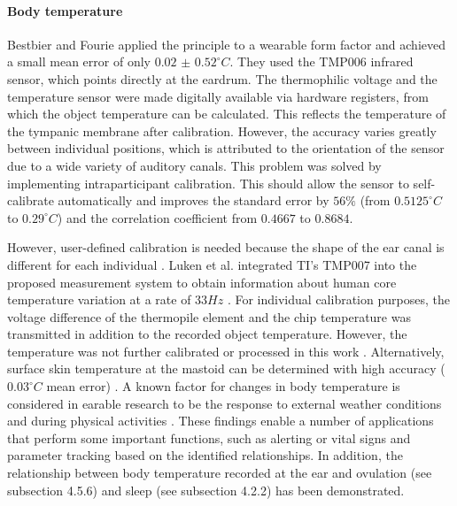 \paragraph{Body temperature}
\label{Background:SensingWithEarables:Physiological:BodyTemperature}
Bestbier and Fourie \cite{bestbierDevelopmentVitalSigns2018} applied the principle to a wearable form factor and achieved a small mean error of only $0.02$ $\pm$ $0.52 ^\circ C$. 
They used the TMP006 infrared sensor, which points directly at the eardrum. 
The thermophilic voltage and the temperature sensor were made digitally available via hardware registers, from which the object temperature can be calculated. 
This reflects the temperature of the tympanic membrane after calibration.
However, the accuracy varies greatly between individual positions, which is attributed to the orientation of the sensor due to a wide variety of auditory canals.
This problem was solved by implementing intraparticipant calibration.
This should allow the sensor to self-calibrate automatically and improves the standard error by $56\%$ (from $0.5125 ^\circ C$ to $0.29 ^\circ C$) and the correlation coefficient from $0.4667$ to $0.8684$.

However, user-defined calibration is needed because the shape of the ear canal is different for each individual \cite{bestbierDevelopmentVitalSigns2018, luekenPhotoplethysmographybasedInearSensor2017, matsumotoEarbudtypeWearableHearable2019}.
Luken et al. integrated TI's TMP007 into the proposed measurement system to obtain information about human core temperature variation at a rate of $33 Hz$ \cite{luekenPhotoplethysmographybasedInearSensor2017}.
For individual calibration purposes, the voltage difference of the thermopile element and the chip temperature was transmitted in addition to the recorded object temperature.
However, the temperature was not further calibrated or processed in this work \cite{luekenPhotoplethysmographybasedInearSensor2017}.
Alternatively, surface skin temperature at the mastoid can be determined with high accuracy ($0.03 ^\circ C$ mean error) \cite{atallahErgonomicWearableCore2018}.
A known factor for changes in body temperature is considered in earable research to be the response to external weather conditions \cite{barralonAugmentedHearingAssistance2015, boanoNoninvasiveMeasurementCore2013, celikEvaluationBehindtheEarECG2016} and during physical activities \cite{boanoNoninvasiveMeasurementCore2013, chagllae.MeasurementCoreBody2018, celikEvaluationBehindtheEarECG2016, matsumotoEarbudtypeWearableHearable2019, sugimotoDevelopmentWirelessSensing2011}.
These findings enable a number of applications that perform some important functions, such as alerting or vital signs and parameter tracking based on the identified relationships.
In addition, the relationship between body temperature recorded at the ear and ovulation (see subsection 4.5.6) and sleep (see subsection 4.2.2) has been demonstrated.


